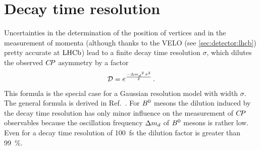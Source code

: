 \section{Decay time resolution}
\label{sec:dataanalysis::resolution}

Uncertainties in the determination of the position of vertices and in the
measurement of momenta (although thanks to the VELO (see
\cref{sec:detector:lhcb}) pretty accurate  at $\mbox{LHCb}$) lead to a finite decay
time resolution $\sigma$, which dilutes the observed ${C\!P}$ asymmetry by a
factor
\begin{align}
  \mathcal{D} = e^{\frac{-{\Delta m_{{d}}}^2\,\sigma^2}{2}} \, .
\end{align}
This formula is the special case for a Gaussian resolution model with width
$\sigma$. The general formula is derived in
Ref.~\cite{ResolutionDilutionFactor}. For ${{B}^0}$ mesons the dilution induced by
the decay time resolution has only minor influence on the measurement of ${C\!P}$
observables because the oscillation frequency ${\Delta m_{{d}}}$ of ${{B}^0}$ mesons is
rather low. Even for a decay time resolution of \SI{100}{\fs} the dilution
factor is greater than \SI{99}{\percent}.